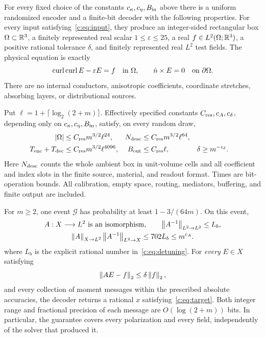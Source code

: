 \begin{theorem}
\label{c:thm:main}
For every fixed choice of the constants $c_\kappa,c_\eta,B_{\rm in}$ above there is a uniform
randomized encoder and a finite-bit decoder with the following properties.
For every input satisfying~\eqref{c:eq:input}, they produce an integer-sided
rectangular box $\Omega\subset\mathbb R^3$, a finitely represented real scalar
$1\le\varepsilon\le25$, a real $f\in L^2(\Omega;\mathbb R^3)$, a positive
rational tolerance $\delta$, and finitely represented real $L^2$ test fields.
The physical equation is exactly
\begin{equation}
 \operatorname{curl}\operatorname{curl} E-\varepsilon E=f\quad\text{in }\Omega,
 \qquad \hat n\times E=0\quad\text{on }\partial\Omega.       \label{c:eq:physical}
\end{equation}
There are no internal conductors, anisotropic coefficients, coordinate
stretches, absorbing layers, or distributional sources.

Put $\ell=1+\lceil\log_2(2+m)\rceil$. Effectively specified constants
$C_{\rm res},c_A,c_\delta$, depending only on $c_\kappa,c_\eta,B_{\rm in}$, satisfy, on every random draw,
\begin{align}
 |\Omega|&\le C_{\rm res}m^{3/2}\ell^{24},
 &N_{\rm desc}&\le C_{\rm res}m^{3/2}\ell^{64},       \label{c:eq:volume-description}\\
 T_{\rm enc}+T_{\rm dec}&\le C_{\rm res}m^{3/2}\ell^{4096},
 &B_{\rm out}&\le C_{\rm res}\ell,
 &\delta&\ge m^{-c_\delta}.                              \label{c:eq:resources}
\end{align}
Here $N_{\rm desc}$ counts the whole ambient box in unit-volume cells and
all coefficient and index slots in the finite source, material, and readout
format. Times are bit-operation bounds. All calibration, empty space,
routing, mediators, buffering, and finite output are included.

For $m\ge2$, one event $\mathcal G$ has probability at least
$1-3/(64m)$. On this event,
\begin{equation}
 \begin{gathered}
 A:X\longrightarrow L^2\text{ is an isomorphism},\qquad
 \left\lVert A^{-1}\right\rVert_{L^2\to L^2}\le L_b,\\
 \left\lVert A\right\rVert_{X\to L^2}\left\lVert A^{-1}\right\rVert_{L^2\to X}
 \le702L_b\le m^{c_A}.
 \end{gathered}                                    \label{c:eq:maininverse}
\end{equation}
where $L_b$ is the explicit rational number in~\eqref{c:eq:detuning}.
For \emph{every} $E\in X$ satisfying
\begin{equation}
 \left\lVert AE-f\right\rVert_2\le\delta\left\lVert f\right\rVert_2,                    \label{c:eq:physicalres}
\end{equation}
and every collection of moment messages within the prescribed absolute
accuracies, the decoder returns a rational $x$ satisfying~\eqref{c:eq:target}.
Both integer range and fractional precision of each message are
$O(\log(2+m))$ bits. In particular, the guarantee covers every polarization and every field,
independently of the solver that produced it.
\end{theorem}

